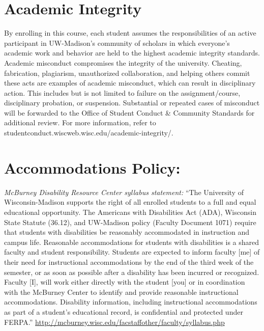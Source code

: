 \documentclass[11pt,man]{article}
\begin{document}
\hypertarget{academic-integrity}{%
\section{Academic Integrity}\label{academic-integrity}}

By enrolling in this course, each student assumes the responsibilities
of an active participant in UW-Madison's community of scholars in which
everyone's academic work and behavior are held to the highest academic
integrity standards. Academic misconduct compromises the integrity of
the university. Cheating, fabrication, plagiarism, unauthorized
collaboration, and helping others commit these acts are examples of
academic misconduct, which can result in disciplinary action. This
includes but is not limited to failure on the assignment/course,
disciplinary probation, or suspension. Substantial or repeated cases of
misconduct will be forwarded to the Office of Student Conduct \&
Community Standards for additional review. For more information, refer
to studentconduct.wiscweb.wisc.edu/academic-integrity/.

\hypertarget{accommodations-policy}{%
\section{Accommodations Policy:}\label{accommodations-policy}}

\emph{McBurney Disability Resource Center syllabus statement:} ``The
University of Wisconsin-Madison supports the right of all enrolled
students to a full and equal educational opportunity. The Americans with
Disabilities Act (ADA), Wisconsin State Statute (36.12), and UW-Madison
policy (Faculty Document 1071) require that students with disabilities
be reasonably accommodated in instruction and campus life. Reasonable
accommodations for students with disabilities is a shared faculty and
student responsibility. Students are expected to inform faculty {[}me{]}
of their need for instructional accommodations by the end of the third
week of the semester, or as soon as possible after a disability has been
incurred or recognized. Faculty {[}I{]}, will work either directly with
the student {[}you{]} or in coordination with the McBurney Center to
identify and provide reasonable instructional accommodations. Disability
information, including instructional accommodations as part of a
student's educational record, is confidential and protected under
FERPA.''
\url{http://mcburney.wisc.edu/facstaffother/faculty/syllabus.php}
\end{document}

